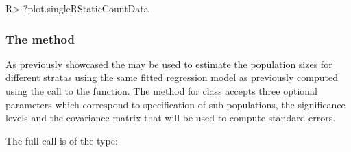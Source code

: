 \documentclass[
]{jss}
\newcommand{\1}{\mathcal{I}} \newcommand{\bZero}{\boldsymbol{0}}
\begin{document}
\begin{CodeChunk}
\begin{CodeInput}
R> ?plot.singleRStaticCountData
\end{CodeInput}
\end{CodeChunk}

\subsubsection[The stratifyPopsize method]{The 
method}\label{the-method}

As previously showcased the  may be used to
estimate the population sizes for different stratas using the same
fitted regression model as previously computed using the call to the
 function. The method for
 class accepts three optional parameters
 which correspond to specification of sub
populations, the significance levels and the covariance matrix that will
be used to compute standard errors.

The full call is of the type: \footnotesize
\end{document}
